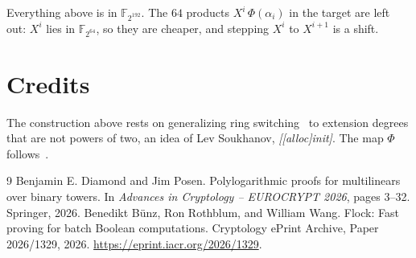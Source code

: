 \documentclass[11pt]{article}
\newcommand{\F}{\mathbb{F}}
\begin{document}
Everything above is in $\F_{2^{192}}$. The $64$ products $X^i\,\Phi(\alpha_i)$ in the target are left out: $X^i$ lies in $\F_{2^{64}}$, so they are cheaper, and stepping $X^i$ to $X^{i+1}$ is a shift.

\section*{Credits}

The construction above rests on generalizing ring switching~\cite{DP26} to extension degrees that are not powers of two, an idea of Lev Soukhanov, \textit{[[alloc]init]}. The map $\Phi$ follows~\cite{Flock}.

\begin{thebibliography}{9}
 Benjamin E. Diamond and Jim Posen. Polylogarithmic proofs for multilinears over binary towers. In \emph{Advances in Cryptology -- EUROCRYPT 2026}, pages 3--32. Springer, 2026.
 Benedikt B\"unz, Ron Rothblum, and William Wang. Flock: Fast proving for batch Boolean computations. Cryptology ePrint Archive, Paper 2026/1329, 2026. \url{https://eprint.iacr.org/2026/1329}.
\end{thebibliography}
\end{document}
